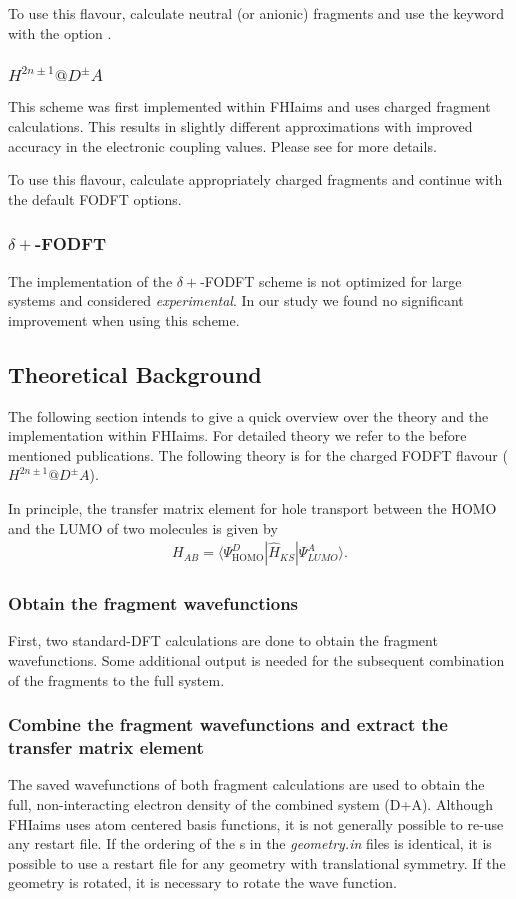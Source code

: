 To use this flavour, calculate neutral (or anionic) fragments and use the  keyword with the option . 

\subsubsection*{$H^{2n\pm 1}@D^\pm A$}
This scheme was first implemented within FHIaims and uses charged fragment calculations. This results in slightly different approximations with improved accuracy in the electronic coupling values. Please see \cite{Schober2015} for more details. 

To use this flavour, calculate appropriately charged fragments and continue with the default FODFT options.

\subsubsection*{$\delta+$-FODFT}
The implementation of the $\delta+$-FODFT scheme is not optimized for large systems and considered \emph{experimental}. In our study\cite{Schober2015} we found no significant improvement when using this scheme. 

\subsection*{Theoretical Background}
The following section intends to give a quick overview over the theory and the implementation within FHIaims. For detailed theory we refer to the before mentioned publications. The following theory is for the charged FODFT flavour ($H^{2n\pm 1}@D^\pm A$). 

In principle, the transfer matrix element for hole transport between the HOMO and the LUMO of two molecules is given by
\begin{align}
H_{AB} = \langle\Psi^{D}_{\text{HOMO}}|\hat{H}_{KS}|\Psi^A_{LUMO}\rangle.
\end{align}

\subsubsection*{Obtain the fragment wavefunctions}
First, two standard-DFT calculations are done to obtain the fragment wavefunctions. Some additional output is needed for the subsequent combination of the fragments to the full system. 

\subsubsection*{Combine the fragment wavefunctions and extract the transfer matrix element}
The saved wavefunctions of both fragment calculations are used to obtain the full, non-interacting electron density of the combined system (D+A). Although FHIaims uses atom centered basis functions, it is not generally possible to re-use any restart file. If the ordering of the s in the \emph{geometry.in} files is identical, it is possible to use a restart file for any geometry with translational symmetry. If the geometry is rotated, it is necessary to rotate the wave function. 

